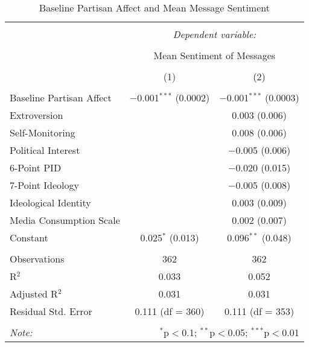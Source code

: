 
\begin{table}[H] \centering 
  \caption{Baseline Partisan Affect and Mean Message Sentiment} 
  \label{tab:s2_sentiment} 
\begin{tabular}{@{\extracolsep{5pt}}lcc} 
\\[-1.8ex]\hline 
\hline \\[-1.8ex] 
 & \multicolumn{2}{c}{\textit{Dependent variable:}} \\ 
\cline{2-3} 
\\[-1.8ex] & \multicolumn{2}{c}{Mean Sentiment of Messages} \\ 
\\[-1.8ex] & (1) & (2)\\ 
\hline \\[-1.8ex] 
 Baseline Partisan Affect & $-$0.001$^{***}$ (0.0002) & $-$0.001$^{***}$ (0.0003) \\ 
  Extroversion &  & 0.003 (0.006) \\ 
  Self-Monitoring &  & 0.008 (0.006) \\ 
  Political Interest &  & $-$0.005 (0.006) \\ 
  6-Point PID &  & $-$0.020 (0.015) \\ 
  7-Point Ideology &  & $-$0.005 (0.008) \\ 
  Ideological Identity &  & 0.003 (0.009) \\ 
  Media Consumption Scale &  & 0.002 (0.007) \\ 
  Constant & 0.025$^{*}$ (0.013) & 0.096$^{**}$ (0.048) \\ 
 \hline \\[-1.8ex] 
Observations & 362 & 362 \\ 
R$^{2}$ & 0.033 & 0.052 \\ 
Adjusted R$^{2}$ & 0.031 & 0.031 \\ 
Residual Std. Error & 0.111 (df = 360) & 0.111 (df = 353) \\ 
\hline 
\hline \\[-1.8ex] 
\textit{Note:}  & \multicolumn{2}{r}{$^{*}$p$<$0.1; $^{**}$p$<$0.05; $^{***}$p$<$0.01} \\ 
\end{tabular} 
\end{table} 
